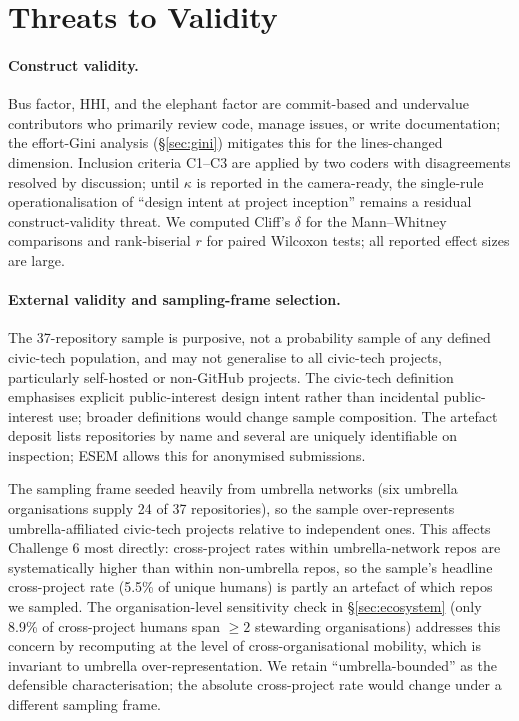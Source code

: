 \documentclass[a4paper,UKenglish,cleveref,autoref,thm-restate]{lipics-v2021}
\begin{document}
\section{Threats to Validity}\label{sec:threats}

\paragraph{Construct validity.}
Bus factor, HHI, and the elephant factor are commit-based and undervalue contributors who primarily review code, manage issues, or write documentation; the effort-Gini analysis (\S\ref{sec:gini}) mitigates this for the lines-changed dimension. Inclusion criteria C1--C3 are applied by two coders with disagreements resolved by discussion; until $\kappa$ is reported in the camera-ready, the single-rule operationalisation of ``design intent at project inception'' remains a residual construct-validity threat. We computed Cliff's $\delta$ for the Mann--Whitney comparisons and rank-biserial $r$ for paired Wilcoxon tests; all reported effect sizes are large.

\paragraph{External validity and sampling-frame selection.}
The 37-repository sample is purposive, not a probability sample of any defined civic-tech population, and may not generalise to all civic-tech projects, particularly self-hosted or non-GitHub projects. The civic-tech definition emphasises explicit public-interest design intent rather than incidental public-interest use; broader definitions would change sample composition. The artefact deposit lists repositories by name and several are uniquely identifiable on inspection; ESEM allows this for anonymised submissions.

The sampling frame seeded heavily from umbrella networks (six umbrella organisations supply 24 of 37 repositories), so the sample over-represents umbrella-affiliated civic-tech projects relative to independent ones. This affects Challenge 6 most directly: cross-project rates within umbrella-network repos are systematically higher than within non-umbrella repos, so the sample's headline cross-project rate (5.5\% of unique humans) is partly an artefact of which repos we sampled. The organisation-level sensitivity check in \S\ref{sec:ecosystem} (only 8.9\% of cross-project humans span $\geq 2$ stewarding organisations) addresses this concern by recomputing at the level of cross-organisational mobility, which is invariant to umbrella over-representation. We retain ``umbrella-bounded'' as the defensible characterisation; the absolute cross-project rate would change under a different sampling frame.
\end{document}
